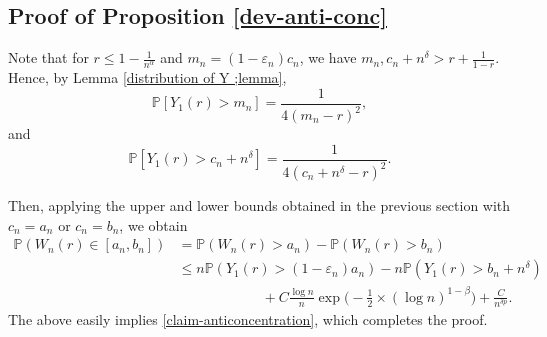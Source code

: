 \documentclass[9pt,a4paper,reqno]{amsart}
\theoremstyle{mine}
\newtheorem{thm}{Theorem}[section]
\theoremstyle{definition}
\theoremstyle{remark}
\renewcommand\epsilon{\varepsilon}
\newcommand{\mb}{\mathbb}
\begin{document}
\subsection{Proof of  Proposition \ref{dev-anti-conc}}

Note that for $ r \leq 1 - \frac{1}{n^\alpha}$ and $m_n = (1-\epsilon_n)c_n$, we have $m_n, c_n + n^{\delta}> r + \frac{1}{1-r}$. Hence, by Lemma \ref{distribution of Y ;lemma}, 
\[ \mb{P}[Y_1(r) > m_n ] = \frac{1}{4(m_n-r)^2},\]
and \[ \mb{P}[Y_1(r) > c_n + n^{\delta} ] = \frac{1}{4( c_n + n^{\delta}-r)^2}.\]

Then, applying the upper and lower bounds obtained in the previous section with $c_n = a_n$ or $c_n = b_n$, we obtain 
\begin{align}
    \mb{P}(W_n(r) \in [a_n, b_n])
    &= \mb{P}(W_n(r) >a_n) - \mb{P}(W_n(r) >b_n)\nonumber  \\
    & \leq n \mb{P} (Y_1(r) > (1-\epsilon_n)a_n ) - n \mb{P} (Y_1(r) > b_n + n^{\delta})\nonumber \\ & \qquad\qquad\qquad +  C \frac{\log n}{n}\exp\biggl(-\frac{1}{2}\times(\log n)^{1-\beta} \biggr) + \frac{C}{n^{\delta p}}. \nonumber
\end{align} 
The above easily implies \eqref{claim-anticoncentration}, which completes the proof. 
    
    


\end{document}
